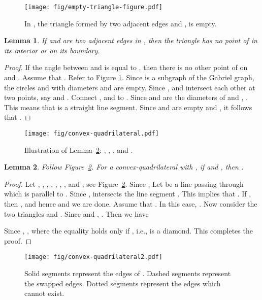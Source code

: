 \documentclass[11pt,a4paper]{article}
\newtheorem{lemma}{Lemma}
\begin{document}
\begin{figure}[ht]
  \centering
    \texttt{[image: fig/empty-triangle-figure.pdf]}
  \caption{In , the triangle  formed by two adjacent edges  and , is empty.}
\label{empty-triangle-figure}
\end{figure}
\begin{lemma}
\label{empty-triangle-lemma}
If  and  are two adjacent edges in , then the triangle  has no point of  in its interior or on its boundary.
\end{lemma}
\begin{proof}
If the angle between  and  is equal to , then there is no other point of  on  and . Assume that . Refer to Figure \ref{empty-triangle-figure}. Since  is a subgraph of the Gabriel graph, the circles  and  with diameters  and  are empty. Since ,  and  intersect each other at two points, say  and . Connect ,  and  to . Since  and  are the diameters of  and , .
This means that  is a straight line segment. Since  and  are empty and , it follows that .
\end{proof}

\begin{figure}[htb]
  \centering
  \texttt{[image: fig/convex-quadrilateral.pdf]}
  \caption{Illustration of Lemma~\ref{convex-quadrilateral-lemma}: , , , and .}
\label{convex-quadrilateral-fig}
\end{figure}

\begin{lemma}
\label{convex-quadrilateral-lemma}
Follow Figure~\ref{convex-quadrilateral-fig}. For a convex-quadrilateral  with , if   and , then .
\end{lemma}
\begin{proof}
 Let , , , , , , , and ; see Figure~\ref{convex-quadrilateral-fig}. Since ,  Let  be a line passing through  which is parallel to . Since ,  intersects the line segment . This implies that . If , then , and hence  and we are done. Assume that . In this case, . Now consider the two triangles  and . Since  and , . Then we have 

Since , , where the equality holds only if , i.e.,  is a diamond. This completes the proof.
\end{proof}

\begin{figure}[htb]
  \centering
  \texttt{[image: fig/convex-quadrilateral2.pdf]}
  \caption{Solid segments represent the edges of . Dashed segments represent the swapped edges. Dotted segments represent the edges which cannot exist.}
\label{degree8-fig}
\end{figure}
\end{document}
